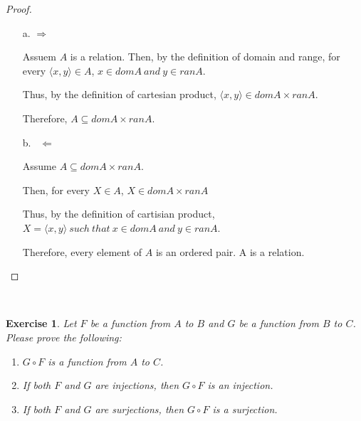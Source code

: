 \documentclass[12pt,a4paper,utf8]{article}
\theoremstyle{plain}
\newtheorem{exercise}{Exercise}
\begin{document}
\begin{proof}\ 
\begin{enumerate}
    \item[a.] $\Rightarrow\ $
    
    Assuem $A$ is a relation.
    Then, by the definition of domain and range, for every $\langle x,y \rangle \in A$, $x \in domA\ and\ y \in ranA$.

    Thus, by the definition of cartesian product, $\langle x,y \rangle \in domA \times ranA$.
    
    Therefore, $A \subseteq domA \times ranA $.
    
    \item[b.]\ $\Leftarrow $

    Assume $A \subseteq domA \times ranA $.
    
    Then, for every $X \in A$, $X \in domA \times ranA\ $
    
    Thus, by the definition of cartisian product, $X=\langle x,y \rangle\ such\ that\ x \in domA\ and\ y \in ranA$.
    
    Therefore, every element of $A$ is an ordered pair. A is a relation.
\end{enumerate}
\end{proof}

\ \\
\begin{exercise}
Let $F$ be a function from $A$ to $B$ and $G$ be a function from  $B$ to $C$.
Please prove the following:
%
\begin{enumerate}

\item $G \circ F$ is a function from $A$ to $C$.

\item If both $F$ and $G$ are injections, then $G \circ F$ is an injection.

\item If both $F$ and $G$ are surjections, then $G \circ F$ is a surjection.

\end{enumerate} 
\end{exercise}
\end{document}
